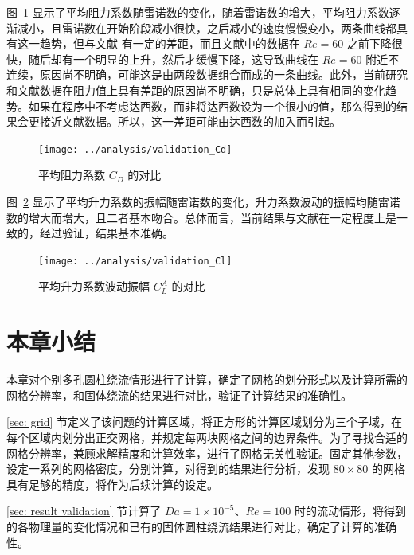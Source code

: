 图~\ref{fig: validation-Cd} 显示了平均阻力系数随雷诺数的变化，随着雷诺数的增大，平均阻力系数逐渐减小，且雷诺数在开始阶段减小很快，之后减小的速度慢慢变小，两条曲线都具有这一趋势，但与文献  有一定的差距，而且文献中的数据在 $Re=60$ 之前下降很快，随后却有一个明显的上升，然后才缓慢下降，这导致曲线在 $Re=60$ 附近不连续，原因尚不明确，可能这是由两段数据组合而成的一条曲线。此外，当前研究和文献数据在阻力值上具有差距的原因尚不明确，只是总体上具有相同的变化趋势。如果在程序中不考虑达西数，而非将达西数设为一个很小的值，那么得到的结果会更接近文献数据。所以，这一差距可能由达西数的加入而引起。

\begin{figure}
	\centering
	\texttt{[image: ../analysis/validation\_Cd]}
	\caption{平均阻力系数 $C_D$ 的对比}
	\label{fig: validation-Cd}
\end{figure}

图~\ref{fig: validation-Cl} 显示了平均升力系数的振幅随雷诺数的变化，升力系数波动的振幅均随雷诺数的增大而增大，且二者基本吻合。总体而言，当前结果与文献在一定程度上是一致的，经过验证，结果基本准确。

\begin{figure}
	\centering
	\texttt{[image: ../analysis/validation\_Cl]}
	\caption{平均升力系数波动振幅 $C_L^A$ 的对比}
	\label{fig: validation-Cl}
\end{figure}

\section{本章小结}

本章对个别多孔圆柱绕流情形进行了计算，确定了网格的划分形式以及计算所需的网格分辨率，和固体绕流的结果进行对比，验证了计算结果的准确性。

\ref{sec: grid} 节定义了该问题的计算区域，将正方形的计算区域划分为三个子域，在每个区域内划分出正交网格，并规定每两块网格之间的边界条件。为了寻找合适的网格分辨率，兼顾求解精度和计算效率，进行了网格无关性验证。固定其他参数，设定一系列的网格密度，分别计算，对得到的结果进行分析，发现 $80\times 80$ 的网格具有足够的精度，将作为后续计算的设定。

\ref{sec: result validation} 节计算了 $Da=1\times 10^{-5}$、$Re=100$ 时的流动情形，将得到的各物理量的变化情况和已有的固体圆柱绕流结果进行对比，确定了计算的准确性。
